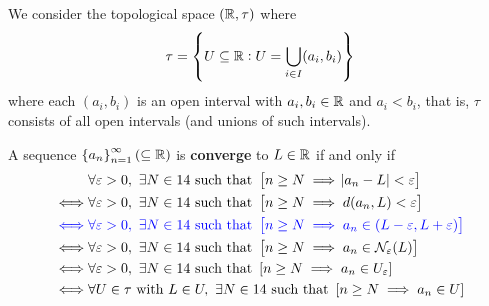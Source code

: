 \documentclass[11pt,openany]{article}
\begin{document}
\begin{note}
	We consider the topological space 
	$(\mathbb{R},\tau)$ where \[
	\tau=\set{U\subseteq\mathbb{R}:U=\bigcup_{i\in I}(a_i,b_i)}
	\] where each $(a_i,b_i)$ is an open interval with $a_i,b_i\in\mathbb{R}$ and $a_i<b_i$, that is, $\tau$ consists of all open intervals (and unions of such intervals).\par
	A sequence $\set{a_n}_{n=1}^\infty(\subseteq\mathbb{R})$ is \textbf{converge} to $L\in\mathbb{R}$ if and only if 
	\begin{align*}
	&\forall\varepsilon>0,\ \exists N\in\N\ \text{such that}\ \left[ n\geq N\implies \abs{a_n-L}<\varepsilon\right]\\
	\iff&\forall\varepsilon>0,\ \exists N\in\N\ \text{such that}\ \left[ n\geq N\implies d(a_n,L)<\varepsilon\right]\\
	\color{blue}\iff&\color{blue}\forall\varepsilon>0,\ \exists N\in\N\ \text{such that}\ \left[ n\geq N\implies a_n\in(L-\varepsilon,L+\varepsilon)\right]\\
	\iff&\forall\varepsilon>0,\ \exists N\in\N\ \text{such that}\ \left[ n\geq N\implies a_n\in\nbhd_\varepsilon (L)\right]\\
	\iff&\forall\varepsilon>0,\ \exists N\in\N\ \text{such that}\ \left[ n\geq N\implies a_n\in U_\varepsilon\right] \\
	\iff&\forall U\in\tau\ \text{with}\ L\in U,\ \exists N\in\N\ \text{such that}\ \left[ n\geq N\implies a_n\in U\right]
	\end{align*}
\begin{center}
\end{center}
\end{note}
\end{document}
